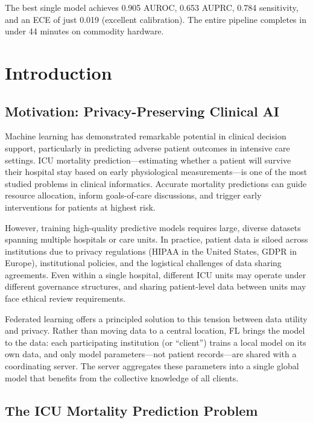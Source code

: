 \documentclass[11pt,a4paper]{report}
\begin{document}
The best single model achieves 0.905 AUROC, 0.653 AUPRC, 0.784 sensitivity, and an ECE of just 0.019 (excellent calibration). The entire pipeline completes in under 44 minutes on commodity hardware.


\chapter{Introduction}

\section{Motivation: Privacy-Preserving Clinical AI}

Machine learning has demonstrated remarkable potential in clinical decision support, particularly in predicting adverse patient outcomes in intensive care settings. ICU mortality prediction---estimating whether a patient will survive their hospital stay based on early physiological measurements---is one of the most studied problems in clinical informatics. Accurate mortality predictions can guide resource allocation, inform goals-of-care discussions, and trigger early interventions for patients at highest risk.

However, training high-quality predictive models requires large, diverse datasets spanning multiple hospitals or care units. In practice, patient data is siloed across institutions due to privacy regulations (HIPAA in the United States, GDPR in Europe), institutional policies, and the logistical challenges of data sharing agreements. Even within a single hospital, different ICU units may operate under different governance structures, and sharing patient-level data between units may face ethical review requirements.

Federated learning offers a principled solution to this tension between data utility and privacy. Rather than moving data to a central location, FL brings the model to the data: each participating institution (or ``client'') trains a local model on its own data, and only model parameters---not patient records---are shared with a coordinating server. The server aggregates these parameters into a single global model that benefits from the collective knowledge of all clients.

\section{The ICU Mortality Prediction Problem}
\end{document}
